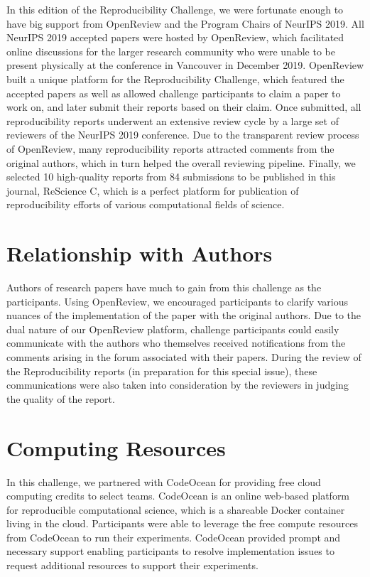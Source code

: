 In this edition of the Reproducibility Challenge, we were fortunate enough to have big support from OpenReview and the Program Chairs of NeurIPS 2019. All NeurIPS 2019 accepted papers were hosted by OpenReview, which facilitated online discussions for the larger research community who were unable to be present physically at the conference in Vancouver in December 2019. OpenReview built a unique platform for the Reproducibility Challenge, which featured the accepted papers as well as allowed challenge participants to claim a paper to work on, and later submit their reports based on their claim. Once submitted, all reproducibility reports underwent an extensive review cycle by a large set of reviewers of the NeurIPS 2019 conference. Due to the transparent review process of OpenReview, many reproducibility reports attracted comments from the original authors, which in turn helped the overall reviewing pipeline. Finally, we selected 10 high-quality reports from 84 submissions to be published in this journal, ReScience C, which is a perfect platform for publication of reproducibility efforts of various computational fields of science.

\section{Relationship with Authors}

Authors of research papers have much to gain from this challenge as the participants. Using OpenReview, we encouraged participants to clarify various nuances of the implementation of the paper with the original authors. Due to the dual nature of our OpenReview platform, challenge participants could easily communicate with the authors who themselves received notifications from the comments arising in the forum associated with their papers. During the review of the Reproducibility reports (in preparation for this special issue), these communications were also taken into consideration by the reviewers in judging the quality of the report.

\section{Computing Resources} 

In this challenge, we partnered with CodeOcean for providing free cloud computing credits to select teams. CodeOcean is an online web-based platform for reproducible computational science, which is a shareable Docker container living in the cloud. Participants were able to leverage the free compute resources from CodeOcean to run their experiments. CodeOcean provided prompt and necessary support enabling participants to resolve implementation issues to request additional resources to support their experiments.


